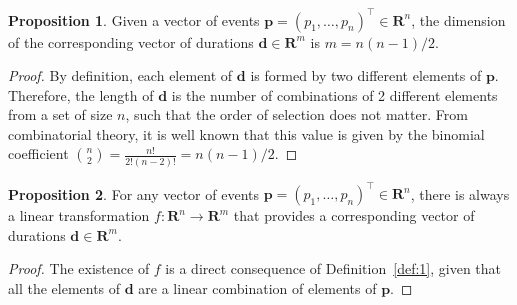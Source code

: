 \documentclass[12pt,oneside,a4paper]{article} %
\theoremstyle{definition}
\newtheorem{proposition}{Proposition}[section]
\begin{document}
\begin{proposition}
  Given a vector of events $\boldsymbol{p}=(p_1,\ldots,p_n)^\top\in\mathbf{R}^n$, the dimension of the corresponding vector of durations $\boldsymbol{d}\in\mathbf{R}^m$ is $m=n(n-1)/2$.
\end{proposition}

\begin{proof}
  By definition, each element of $\boldsymbol{d}$ is formed by two different elements of $\boldsymbol{p}$. Therefore, the length of $\boldsymbol{d}$ is the number of combinations of 2 different elements from a set of size $n$, such that the order of selection does not matter. From combinatorial theory, it is well known that this value is given by the binomial coefficient $\binom{n}{2}=\frac{n!}{2!(n-2)!}=n(n-1)/2$.
\end{proof}

\begin{proposition}
 For any vector of events $\boldsymbol{p}=(p_1,\ldots,p_n)^\top\in\mathbf{R}^n$, there is always a linear transformation $f:\mathbf{R}^n\to\mathbf{R}^m$ that provides a corresponding vector of durations $\boldsymbol{d}\in\mathbf{R}^m$.
 \label{prop:2}
\end{proposition}

\begin{proof}
 The existence of $f$ is a direct consequence of Definition~\ref{def:1}, given that all the elements of $\boldsymbol{d}$ are a linear combination of elements of $\boldsymbol{p}$. 
\end{proof}
\end{document}

